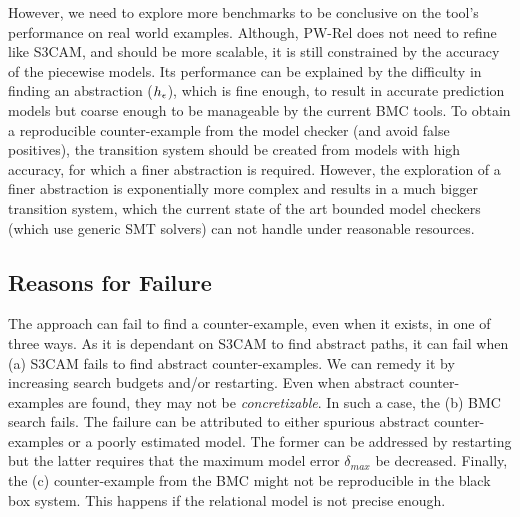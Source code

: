 However, we need to explore more benchmarks to be conclusive on the
tool's performance on real world examples. Although, PW-Rel does not
need to refine like S3CAM, and should be more scalable, it is still
constrained by the accuracy of the piecewise models. Its performance can be
explained by the difficulty in finding an abstraction
($h_\epsilon$), which is fine enough, to result in accurate
prediction models but coarse enough to be manageable by the current
BMC tools.  To obtain a reproducible counter-example from the model
checker (and avoid false positives), the transition system should be
created from models with high accuracy, for which a finer abstraction
is required.  However, the exploration of a finer abstraction is
exponentially more complex and results in a much bigger transition
system, which the current state of the art bounded model checkers
(which use generic SMT solvers) can not handle under reasonable
resources.

\subsection{Reasons for Failure}

The approach can fail to find a counter-example, even when it exists,
in one of three ways. As it is dependant on S3CAM to find abstract
paths, it can fail when (a) S3CAM fails to find abstract
counter-examples. We can remedy it by increasing search budgets and/or
restarting. Even when abstract counter-examples are found, they may
not be \emph{concretizable}. In such a case, the (b) BMC search fails.
The failure can be attributed to either spurious abstract
counter-examples or a poorly estimated model. The former can be
addressed by restarting but the latter requires that the maximum model
error $\delta_{max}$ be decreased. Finally, the (c) counter-example
from the BMC might not be reproducible in the black box system. This
happens if the relational model is not precise enough.
